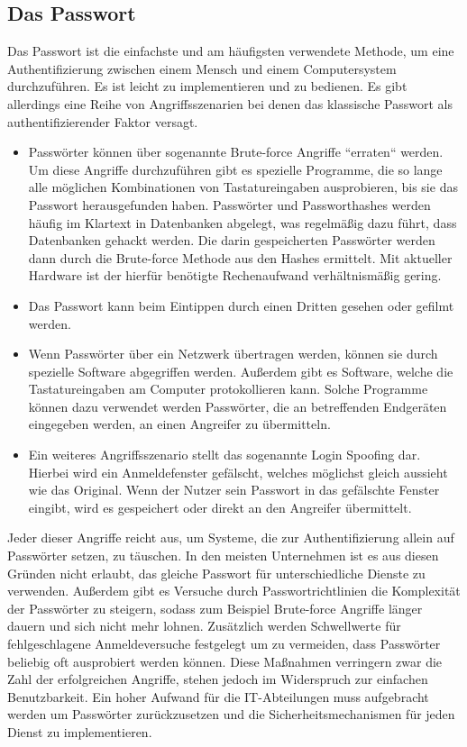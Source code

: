 \documentclass[
book,
a4paper,   
titlepage,  
halfparskip,
12pt        
]{scrartcl}
\begin{document}
\begin{onehalfspacing}
\subsection{Das Passwort}
\label{subsec:pass}
Das Passwort ist die einfachste und am häufigsten verwendete Methode, um eine Authentifizierung zwischen einem Mensch und einem Computersystem durchzuführen. Es ist leicht zu implementieren und zu bedienen. Es gibt allerdings eine Reihe von Angriffsszenarien bei denen das klassische Passwort als authentifizierender Faktor versagt.
\begin{itemize}
	\item Passwörter können über sogenannte Brute-force Angriffe ``erraten`` werden. Um diese Angriffe durchzuführen gibt es spezielle Programme, die so lange alle möglichen Kombinationen von Tastatureingaben ausprobieren, bis sie das Passwort herausgefunden haben. Passwörter und Passworthashes werden häufig im Klartext in Datenbanken abgelegt, was regelmäßig dazu führt, dass Datenbanken gehackt werden. Die darin gespeicherten Passwörter werden dann durch die Brute-force Methode aus den Hashes ermittelt. Mit aktueller Hardware ist der hierfür benötigte Rechenaufwand verhältnismäßig gering.\cite{brute}  
	\item Das Passwort kann beim Eintippen durch einen Dritten gesehen oder gefilmt werden. 
	\item Wenn Passwörter über ein Netzwerk übertragen werden, können sie durch spezielle Software abgegriffen werden. Außerdem gibt es Software, welche die Tastatureingaben am Computer protokollieren kann. Solche Programme können dazu verwendet werden Passwörter, die an betreffenden Endgeräten eingegeben werden, an einen Angreifer zu übermitteln.\cite{key}
	\item Ein weiteres Angriffsszenario stellt das sogenannte Login Spoofing dar. Hierbei wird ein Anmeldefenster gefälscht, welches möglichst gleich aussieht wie das Original. Wenn der Nutzer sein Passwort in das gefälschte Fenster eingibt, wird es gespeichert oder direkt an den Angreifer übermittelt.\cite{spoofing}
\end{itemize}
Jeder dieser Angriffe reicht aus, um Systeme, die zur Authentifizierung allein auf Passwörter setzen, zu täuschen. In den meisten Unternehmen ist es aus diesen Gründen nicht erlaubt, das gleiche Passwort für unterschiedliche Dienste zu verwenden. Außerdem gibt es Versuche durch Passwortrichtlinien die Komplexität der Passwörter zu steigern, sodass zum Beispiel Brute-force Angriffe länger dauern und sich nicht mehr lohnen. Zusätzlich werden Schwellwerte für fehlgeschlagene Anmeldeversuche festgelegt um zu vermeiden, dass Passwörter beliebig oft ausprobiert werden können. Diese Maßnahmen verringern zwar die Zahl der erfolgreichen Angriffe, stehen jedoch im Widerspruch zur einfachen Benutzbarkeit. Ein hoher Aufwand für die \ac{IT}-Abteilungen muss aufgebracht werden um Passwörter zurückzusetzen und die Sicherheitsmechanismen für jeden Dienst zu implementieren.\cite[S. 3ff]{hong}\\

\end{onehalfspacing}
\end{document}
